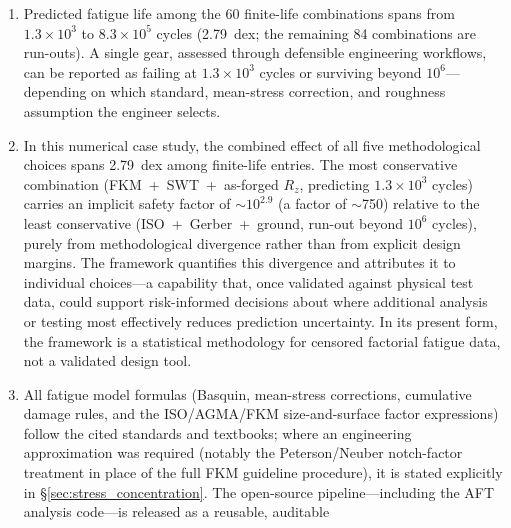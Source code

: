 \documentclass[twocolumn,12pt,a4paper]{article}
\begin{document}
\begin{enumerate}
        near-zero result is therefore not a finding about the
        unimportance of S--N curves in general, but about the
        specific contrast between the two datasets selected.
        The cumulative damage rule contributes 0.3\% under
        constant-amplitude loading; this figure must not be extrapolated
        to variable-amplitude spectra, where sequence effects and
        damage-rule differences could produce substantially larger
        divergence.
  \item Predicted fatigue life among the 60 finite-life combinations spans from
        $1.3\times10^3$ to $8.3\times10^5$ cycles (2.79~dex; the remaining
        84 combinations are run-outs). A single gear, assessed
        through defensible engineering workflows, can be reported as
        failing at $1.3\times10^3$ cycles or surviving beyond $10^6$---depending on
        which standard, mean-stress correction, and roughness
        assumption the engineer selects.
  \item In this numerical case study, the combined effect of all five
        methodological choices spans 2.79~dex among finite-life entries. The most conservative
        combination (FKM~+~SWT~+~as-forged $R_z$, predicting
        $1.3\times10^{3}$ cycles) carries an implicit safety factor of
        $\sim$$10^{2.9}$ (a factor of $\sim$750) relative to the
        least conservative (ISO~+~Gerber~+~ground, run-out beyond
        $10^6$ cycles), purely from
        methodological divergence rather than from explicit design
        margins. The framework quantifies this divergence and attributes
        it to individual choices---a capability that, once validated
        against physical test data, could support risk-informed
        decisions about where additional analysis or testing most
        effectively reduces prediction uncertainty. In its present
        form, the framework is a statistical methodology for censored
        factorial fatigue data, not a validated design tool.
  \item All fatigue model formulas (Basquin, mean-stress corrections,
        cumulative damage rules, and the ISO/AGMA/FKM size-and-surface
        factor expressions) follow the cited standards and textbooks;
        where an engineering approximation was required (notably the
        Peterson/Neuber notch-factor treatment in place of the full FKM
        guideline procedure), it is stated explicitly in
        \S\ref{sec:stress_concentration}. The open-source pipeline---including
        the AFT analysis code---is released as a reusable, auditable
$$
\end{enumerate}
\end{document}
